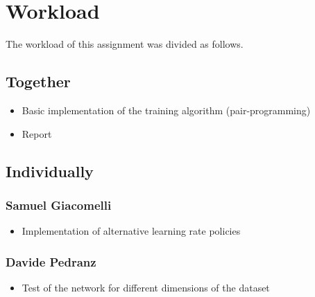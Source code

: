 \section{Workload}
The workload of this assignment was divided as follows.

\subsection{Together}
\begin{itemize}
    \item Basic implementation of the training algorithm (pair-programming)
    \item Report
\end{itemize}

\subsection{Individually}
\subsubsection{Samuel Giacomelli}
\begin{itemize}
    \item Implementation of alternative learning rate policies
\end{itemize}
\subsubsection{Davide Pedranz}
\begin{itemize}
    \item Test of the network for different dimensions of the dataset
\end{itemize}